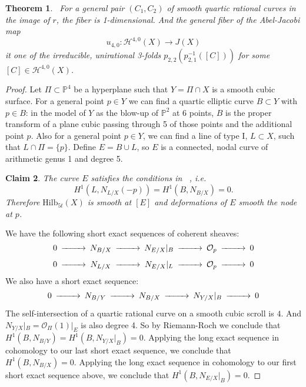 \documentclass[amssymb,twoside,12 pt,amscd,reqno]{amsart}
\theoremstyle{plain}
\newtheorem{thm}{Theorem}[section]
\newtheorem{Claim}[thm]{Claim}
\theoremstyle{definition}
\newcommand{\Hdg}[2]{\mathcal{H}^{#1,#2}}
\newcommand{\PP}{\mathbb{P}}
\newcommand{\HI}[2]{\text{Hilb}_{#1}(#2)}
\newcommand{\OO}{\mathcal O}
\begin{document}
\begin{thm}~\label{thm-1dfib}
 For a general pair $(C_1,C_2)$ of smooth quartic rational
curves in the image of $r$, the fiber is 1-dimensional.  And the
general fiber of the Abel-Jacobi map 
\begin{equation} 
u_{4,0}:\Hdg{4}{0}(X)\rightarrow J(X)
\end{equation}
it one of the irreducible, unirational 3-folds
$p_{2,2}(p_{2,1}^{-1}([C]))$ for some $[C]\in\Hdg{4}{0}(X)$.
\end{thm}

\begin{proof}

Let $\Pi\subset \PP^4$ be a hyperplane such that $Y=\Pi\cap X$ is a
smooth cubic surface.  For a general point $p\in Y$ we can
find a quartic elliptic curve $B\subset Y$ with $p\in B$: in the
model of $Y$ as the blow-up of $\PP^2$ at 6 points, $B$ is
the proper transform of a plane cubic passing through 5 of those
points and the additional point $p$.  Also for a general point
$p\in Y$, we can find a line of type I, $L\subset X$, such that
$L\cap \Pi =\{p\}$.  Define $E=B\cup L$, so $E$ is a connected, nodal
curve of arithmetic genus 1 and degree 5.  

\begin{Claim}\label{claim-a1}
The curve $E$ satisfies the conditions in
~\cite[lemma 2.3]{HRS1},
i.e. 
\begin{equation}
H^1(L,N_{L/X}(-p))=H^1(B,N_{B/X})=0.
\end{equation}  
Therefore $\HI{5t}{X}$ is
smooth at $[E]$ and deformations of $E$ smooth the node at $p$.
\end{Claim}

We have the following short exact sequences of coherent sheaves:
\begin{equation}
\begin{CD}
0 @>>> N_{B/X} @>>> N_{E/X}|_{B} @>>> \OO_p @>>> 0 \\
0 @>>> N_{L/X} @>>> N_{E/X}|_L @>>> \OO_p @>>> 0 \end{CD}
\end{equation}
We also have a short exact sequence:
\begin{equation}
\begin{CD}
0 @>>> N_{B/Y} @>>> N_{B/X} @>>> N_{Y/X}|_{B} @>>> 0 \end{CD}
\end{equation}
The self-intersection of a quartic rational curve on a smooth cubic
scroll is $4$.  And $N_{Y/X}|_{B} = \OO_{\Pi}(1)|_E$ is also degree
4.  So by Riemann-Roch we conclude that
$H^1(B,N_{B/Y})=H^1(B,N_{Y/X}|_{B}) = 0$.  Applying the long exact
sequence in cohomology to our last short exact sequence, we conclude
that $H^1(B,N_{B/X}) = 0$.  Applying the long exact sequence in
cohomology to our first short exact sequence above, we conclude that
$H^1(B,N_{E/X}|_{B}) = 0$.  


\end{proof}
\end{document}
